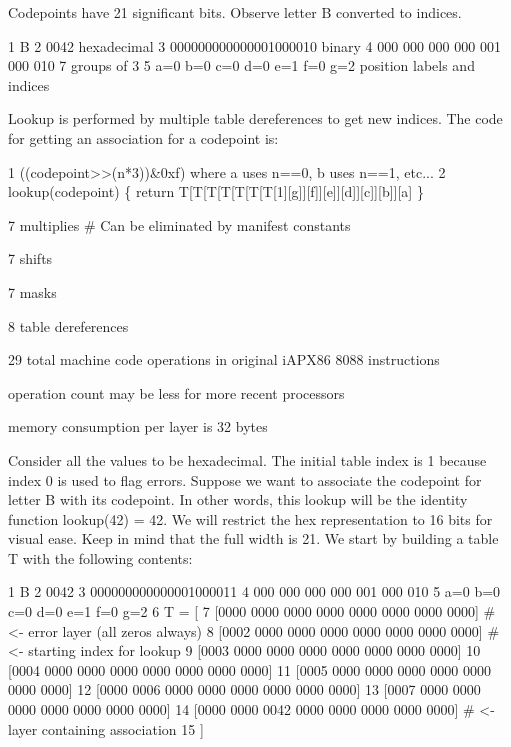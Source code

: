 Codepoints have 21 significant bits. Observe letter B converted to indices. 
\begin{DoxyCode}
1 B
2 0042                          hexadecimal
3 000000000000001000010         binary
4 000 000 000 000 001 000 010   7 groups of 3
5 a=0 b=0 c=0 d=0 e=1 f=0 g=2   position labels and indices
\end{DoxyCode}


Lookup is performed by multiple table dereferences to get new indices. The code for getting an association for a codepoint is\+: 
\begin{DoxyCode}
1 ((codepoint>>(n*3))&0xf) where a uses n==0, b uses n==1, etc...
2 lookup(codepoint) \{ return T[T[T[T[T[T[T[1][g]][f]][e]][d]][c]][b]][a] \}
\end{DoxyCode}

\begin{DoxyItemize}
\item 7 multiplies \# Can be eliminated by manifest constants
\item 7 shifts
\item 7 masks
\item 8 table dereferences
\item 29 total machine code operations in original i\+A\+P\+X86 8088 instructions
\item operation count may be less for more recent processors
\item memory consumption per layer is 32 bytes
\end{DoxyItemize}

Consider all the values to be hexadecimal. The initial table index is 1 because index 0 is used to flag errors. Suppose we want to associate the codepoint for letter \textquotesingle{}B\textquotesingle{} with its codepoint. In other words, this lookup will be the identity function lookup(42) = 42. We will restrict the hex representation to 16 bits for visual ease. Keep in mind that the full width is 21. We start by building a table T with the following contents\+: 
\begin{DoxyCode}
1 B
2 0042
3 000000000000001000011
4 000 000 000 000 001 000 010
5 a=0 b=0 c=0 d=0 e=1 f=0 g=2
6 T = [
7  [0000 0000 0000 0000 0000 0000 0000 0000]  # <- error layer (all zeros always)
8  [0002 0000 0000 0000 0000 0000 0000 0000]  # <- starting index for lookup
9  [0003 0000 0000 0000 0000 0000 0000 0000]
10  [0004 0000 0000 0000 0000 0000 0000 0000]
11  [0005 0000 0000 0000 0000 0000 0000 0000]
12  [0000 0006 0000 0000 0000 0000 0000 0000]
13  [0007 0000 0000 0000 0000 0000 0000 0000]
14  [0000 0000 0042 0000 0000 0000 0000 0000]  # <- layer containing association
15 ]
\end{DoxyCode}


